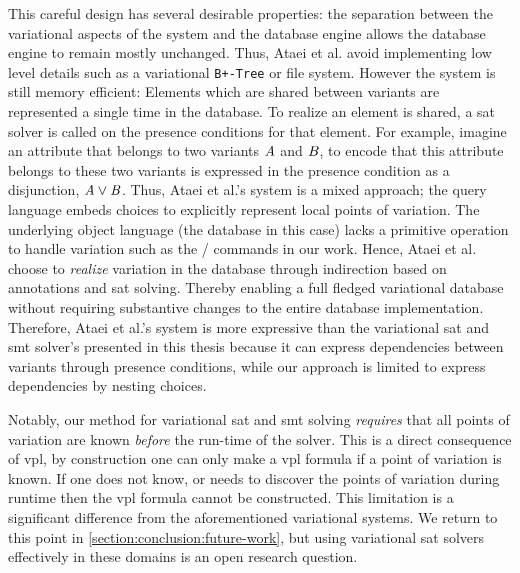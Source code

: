 This careful design has several desirable properties: the separation between the
variational aspects of the system and the database engine allows the database
engine to remain mostly unchanged. Thus, Ataei et al. avoid implementing low
level details such as a variational \texttt{B+-Tree} or file system. However the
system is still memory efficient: Elements which are shared between variants are
represented a single time in the database. To realize an element is shared, a
\ac{sat} solver is called on the presence conditions for that element. For
example, imagine an attribute that belongs to two variants $\mathit{A}$ and
$\mathit{B}$, to encode that this attribute belongs to these two variants is
expressed in the presence condition as a disjunction, $\mathit{A \vee B}$. Thus,
Ataei et al.'s system is a mixed approach; the query language embeds choices to
explicitly represent local points of variation. The underlying object language
(the database in this case) lacks a primitive operation to handle variation such
as the / commands in our work. Hence, Ataei et al. choose to
\emph{realize} variation in the database through indirection based on
annotations and \ac{sat} solving. Thereby enabling a full fledged variational
database without requiring substantive changes to the entire database
implementation. Therefore, Ataei et al.'s system is more expressive than the
variational \ac{sat} and \ac{smt} solver's presented in this thesis because it
can express dependencies between variants through presence conditions, while our
approach is limited to express dependencies by nesting choices.

Notably, our method for variational \ac{sat} and \ac{smt} solving
\emph{requires} that all points of variation are known \emph{before} the
run-time of the solver. This is a direct consequence of \ac{vpl}, by
construction one can only make a \ac{vpl} formula if a point of variation is
known. If one does not know, or needs to discover the points of variation during
runtime then the \ac{vpl} formula cannot be constructed. This limitation is a
significant difference from the aforementioned variational systems. We return to
this point in \autoref{section:conclusion:future-work}, but using variational
\ac{sat} solvers effectively in these domains is an open research question.

